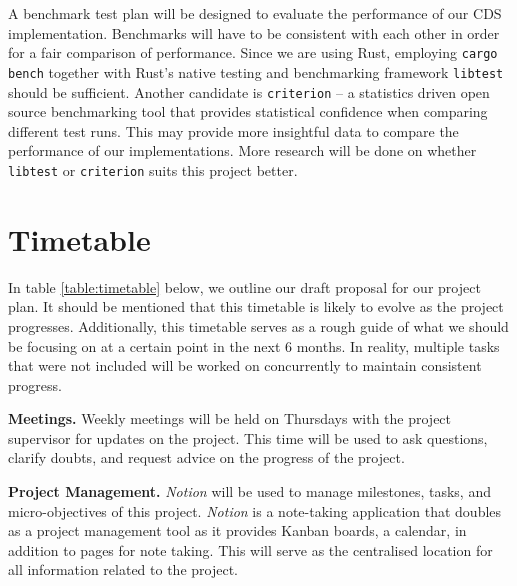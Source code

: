 \documentclass[a4paper,fleqn,12pt]{article}
\begin{document}
A benchmark test plan will be designed to evaluate the performance of our CDS implementation. Benchmarks will have to be consistent with each other in order for a fair comparison of performance. Since we are using Rust, employing \texttt{cargo bench} together with Rust's native testing and benchmarking framework \texttt{libtest} should be sufficient. Another candidate is \texttt{criterion} -- a statistics driven open source benchmarking tool that provides statistical confidence when comparing different test runs. This may provide more insightful data to compare the performance of our implementations. More research will be done on whether \texttt{libtest} or \texttt{criterion} suits this project better.

\section{Timetable}

In table \ref{table:timetable} below, we outline our draft proposal for our project plan. It should be mentioned that this timetable is likely to evolve as the project progresses. Additionally, this timetable serves as a rough guide of what we should be focusing on at a certain point in the next 6 months. In reality, multiple tasks that were not included will be worked on concurrently to maintain consistent progress. 

\textbf{Meetings.} Weekly meetings will be held on Thursdays with the project supervisor for updates on the project. This time will be used to ask questions, clarify doubts, and request advice on the progress of the project. 

\textbf{Project Management.} \textit{Notion} will be used to manage milestones, tasks, and micro-objectives of this project. \textit{Notion} is a note-taking application that doubles as a project management tool as it provides Kanban boards, a calendar, in addition to pages for note taking. This will serve as the centralised location for all information related to the project. 
\end{document}

